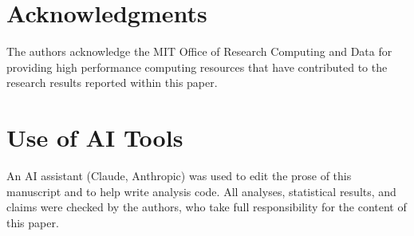 \section*{Acknowledgments}
The authors acknowledge the MIT Office of Research Computing and Data for
providing high performance computing resources that have contributed to the
research results reported within this paper.

\section*{Use of AI Tools}
An AI assistant (Claude, Anthropic) was used to edit the prose of this
manuscript and to help write analysis code. All analyses, statistical
results, and claims were checked by the authors, who take full
responsibility for the content of this paper.
